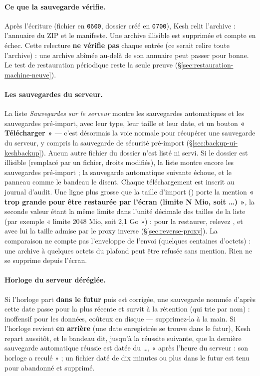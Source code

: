 \documentclass[a4paper,11pt,oneside]{article}
\begin{document}
\paragraph{Ce que la sauvegarde vérifie.} Après l'écriture (fichier en \texttt{0600}, dossier  créé en \texttt{0700}), Kesh relit l'archive : l'annuaire du ZIP et le manifeste. Une archive illisible est supprimée et compte en échec. Cette relecture \textbf{ne vérifie pas} chaque entrée (ce serait relire toute l'archive) : une archive abîmée au-delà de son annuaire peut passer pour bonne. Le test de restauration périodique reste la seule preuve (\S\ref{sec:restauration-machine-neuve}).

\paragraph{Les sauvegardes du serveur.} La liste \emph{Sauvegardes sur le serveur} montre les sauvegardes automatiques et les sauvegardes pré-import, avec leur type, leur taille et leur date, et un bouton \textbf{« Télécharger »} --- c'est désormais la voie normale pour récupérer une sauvegarde du serveur, y compris la sauvegarde de sécurité pré-import (\S\ref{sec:backup-ui-keshbackup}). Aucun autre fichier du dossier n'est listé ni servi. Si le dossier  est illisible (remplacé par un fichier, droits modifiés), la liste montre encore les sauvegardes pré-import ; la sauvegarde automatique suivante échoue, et le panneau comme le bandeau le disent. Chaque téléchargement est inscrit au journal d'audit. Une ligne plus grosse que la taille d'import () porte la mention \textbf{« trop grande pour être restaurée par l'écran (limite N Mio, soit …) »}, la seconde valeur étant la même limite dans l'unité décimale des tailles de la liste (par exemple « limite 2048 Mio, soit 2,1 Go ») : pour la restaurer, relevez , et avec lui la taille admise par le proxy inverse (\S\ref{sec:reverse-proxy}). La comparaison ne compte pas l'enveloppe de l'envoi (quelques centaines d'octets) : une archive à quelques octets du plafond peut être refusée sans mention. Rien ne se supprime depuis l'écran.

\paragraph{Horloge du serveur déréglée.} Si l'horloge part \textbf{dans le futur} puis est corrigée, une sauvegarde nommée d'après cette date passe pour la plus récente et survit à la rétention (qui trie par nom) : inoffensif pour les données, coûteux en disque --- supprimez-la à la main. Si l'horloge revient \textbf{en arrière} (une date enregistrée se trouve dans le futur), Kesh repart aussitôt, et le bandeau dit, jusqu'à la réussite suivante, que la dernière sauvegarde automatique réussie est datée du …, « après l'heure du serveur : son horloge a reculé » ; un fichier  daté de dix minutes ou plus dans le futur est tenu pour abandonné et supprimé.
\end{document}
